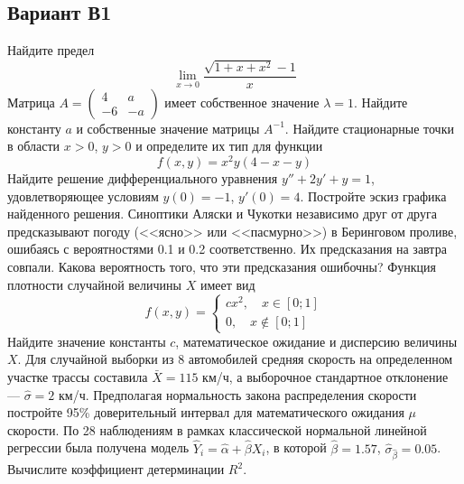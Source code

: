\documentclass[addpoints, answers]{exam} %
\begin{document}
\subsection{Вариант В1}
\begin{questions}
\question  Найдите предел
\[
\lim_{x\to 0} \frac{\sqrt{1+x+x^2}-1}{x}
\]
\question Матрица $A=\left(\begin{array}{cc}
4 & a \\ 
-6 & -a
\end{array}\right)$ имеет собственное значение $\lambda=1$. Найдите константу $a$ и собственные значение матрицы $A^{-1}$.
\question Найдите стационарные точки в области $x>0$, $y>0$ и определите их тип для функции
\[
f(x,y)=x^2y(4-x-y)
\]
\question Найдите решение дифференциального уравнения $y''+2y'+y=1$, удовлетворяющее условиям $y(0)=-1$, $y'(0)=4$. Постройте эскиз графика найденного решения.
\question Синоптики Аляски и Чукотки независимо друг от друга предсказывают погоду (<<ясно>> или <<пасмурно>>) в Беринговом проливе, ошибаясь с вероятностями 0.1 и 0.2 соответственно. Их предсказания на завтра совпали. Какова вероятность того, что эти предсказания ошибочны?
\question Функция плотности случайной величины $X$ имеет вид
\[
f(x,y)=\left\{\begin{array}{c}
cx^2,\quad x\in[0;1] \\ 
0,\quad x\notin [0;1]
\end{array} \right.
\]
Найдите значение константы $c$, математическое ожидание и дисперсию величины $X$.
\question Для случайной выборки из 8 автомобилей средняя скорость на определенном участке трассы составила $\bar{X}=115$ км/ч, а выборочное стандартное отклонение --- $\hat{\sigma}=2$ км/ч. Предполагая нормальность закона распределения скорости постройте 95\% доверительный интервал для математического ожидания $\mu$ скорости.
\question По 28 наблюдениям в рамках классической нормальной линейной регрессии была получена модель $\hat{Y}_i=\hat{\alpha}+\hat{\beta}X_i$, в которой $\hat{\beta}=1.57$, $\hat{\sigma}_{\hat{\beta}}=0.05$. Вычислите коэффициент детерминации $R^2$.
\end{questions}
\end{document}
